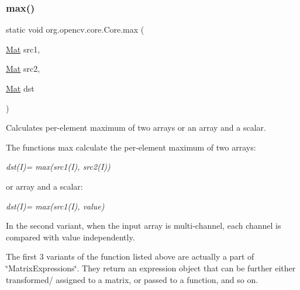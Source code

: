 \subsubsection{\texorpdfstring{max()}{max()}\hspace{0.1cm}{\footnotesize\ttfamily [1/2]}}
{\footnotesize\ttfamily static void org.\+opencv.\+core.\+Core.\+max (\begin{DoxyParamCaption}\item[{\mbox{\hyperlink{classorg_1_1opencv_1_1core_1_1_mat}{Mat}}}]{src1,  }\item[{\mbox{\hyperlink{classorg_1_1opencv_1_1core_1_1_mat}{Mat}}}]{src2,  }\item[{\mbox{\hyperlink{classorg_1_1opencv_1_1core_1_1_mat}{Mat}}}]{dst }\end{DoxyParamCaption})\hspace{0.3cm}{\ttfamily [static]}}

Calculates per-\/element maximum of two arrays or an array and a scalar.

The functions {\ttfamily max} calculate the per-\/element maximum of two arrays\+:

{\itshape dst(\+I)= max(src1(\+I), src2(\+I))}

or array and a scalar\+:

{\itshape dst(\+I)= max(src1(\+I), value)}

In the second variant, when the input array is multi-\/channel, each channel is compared with {\ttfamily value} independently.

The first 3 variants of the function listed above are actually a part of \char`\"{}\+Matrix\+Expressions\char`\"{}. They return an expression object that can be further either transformed/ assigned to a matrix, or passed to a function, and so on.


